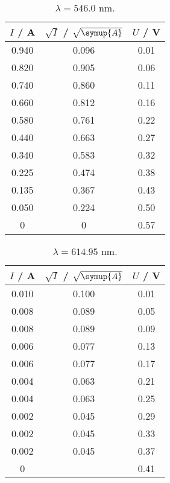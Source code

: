 \begin{table}
\centering
\caption{$\lambda = 546.0$ nm.} 
        \begin{tabular}{c c c}
            \toprule
            { $I$ / A} & {$\sqrt{I}$ / $\sqrt{\symup{A}}$} & {$U$ / V} \\
            \midrule
               0.940 & 0.096 & 0.01 \\
               0.820 & 0.905 & 0.06 \\
               0.740 & 0.860 & 0.11 \\
               0.660 & 0.812 & 0.16 \\
               0.580 & 0.761 & 0.22 \\
               0.440 & 0.663 & 0.27 \\
               0.340 & 0.583 & 0.32 \\
               0.225 & 0.474 & 0.38 \\
               0.135 & 0.367 & 0.43 \\
               0.050 & 0.224 & 0.50 \\
               0     & 0 & 0.57 \\
            \bottomrule
        \end{tabular}
        
        \end{table}
\begin{table}
\centering
\caption{$\lambda = 614.95 $ nm.} 
        \begin{tabular}{c c c}
            \toprule
            { $I$ / A} & {$\sqrt{I}$ / $\sqrt{\symup{A}}$} & {$U$ / V} \\
            \midrule
               0.010 & 0.100 & 0.01 \\
               0.008 & 0.089 & 0.05 \\
               0.008 & 0.089 & 0.09 \\
               0.006 & 0.077 & 0.13 \\
               0.006 & 0.077 & 0.17 \\
               0.004 & 0.063 & 0.21 \\
               0.004 & 0.063 & 0.25 \\
               0.002 & 0.045 & 0.29 \\
               0.002 & 0.045 & 0.33 \\
               0.002 & 0.045 & 0.37 \\
               0 & & 0.41 \\
         \bottomrule
        \end{tabular}
        
        \end{table}
